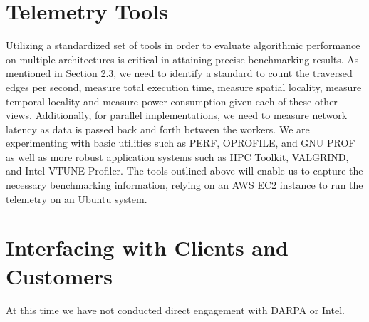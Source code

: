 \documentclass[letterpaper, 10pt]{article}
\begin{document}
\begin{multicols}{2}
    \section{Telemetry Tools}
        Utilizing a standardized set of tools in order to evaluate algorithmic performance on multiple architectures is critical in attaining precise benchmarking results. As mentioned in Section 2.3, we need to identify a standard to count the traversed edges per second, measure total execution time, measure spatial locality, measure temporal locality and measure power consumption given each of these other views. Additionally, for parallel implementations, we need to measure network latency as data is passed back and forth between the workers. We are experimenting with basic utilities such as PERF, OPROFILE, and GNU PROF as well as more robust application systems such as HPC Toolkit, VALGRIND, and Intel VTUNE Profiler. The tools outlined above will enable us to capture the necessary benchmarking information, relying on an AWS EC2 instance to run the telemetry on an Ubuntu system. \\
       
    \section{Interfacing with Clients and Customers}        
        At this time we have not conducted direct engagement with DARPA or Intel.


\end{multicols}
\end{document}
